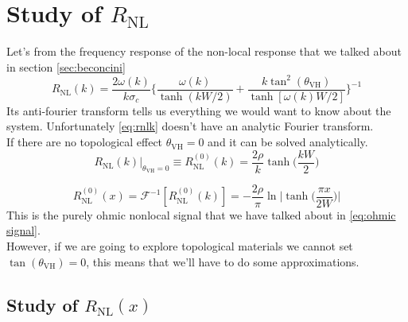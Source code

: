 \chapter{Study of $R_{\textrm{NL}}$}

Let's from the frequency response of the non-local response that we talked about in section \ref{sec:beconcini} \cite{Beconcini_2016}
\begin{equation}
    R_{\textrm{NL}}(k)=\frac{2\omega(k)}{k\sigma_c}
    \bigg\{
        \frac{\omega(k)}{\tanh(kW/2)} + \frac{k\tan^2(\theta_{\textrm{VH}})}{\tanh[\omega(k)W/2]}    
    \bigg\}^{-1}
    \label{eq:rnlk}
\end{equation}
Its anti-fourier transform tells us everything we would want to know about the system. Unfortunately \ref{eq:rnlk} doesn't have an analytic Fourier transform.\\ If there are no topological effect $\theta_{\textrm{VH}}=0$ and it can be solved analytically.
\begin{equation}
    R_{\textrm{NL}}(k)|_{\theta_{\textrm{VH}}=0}\equiv R_{\textrm{NL}}^{(0)}(k)=
    \frac{2\rho}k\tanh\bigg(\frac{kW}2\bigg)
    \label{eq:ohmick}
\end{equation}

\begin{equation}
    R_{\textrm{NL}}^{(0)}(x)=
    \mathcal F^{-1}\left[R_{\textrm{NL}}^{(0)}(k) \right]=
    -\frac{2\rho}\pi\ln\bigg |\tanh \Big(\frac{\pi x}{2W}\Big)\bigg |
    \label{eq:ohmic signal2}
\end{equation}
This is the purely ohmic nonlocal signal that we have talked about in \ref{eq:ohmic signal}.\\
However, if we are going to explore topological materials we cannot set $\tan (\theta_{\textrm{VH}})=0$, this means that we'll have to do some approximations.

\section{Study of $R_{\textrm{NL}}(x)$}

